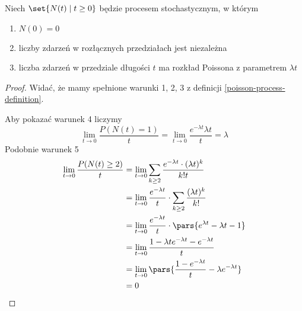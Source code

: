 \begin{theorem}[Twierdzenie 8.8 P\&C]
    Niech \( \set{N(t) \mid t \geq 0} \) będzie procesem stochastycznym, w którym
    \begin{enumerate}
        \item \( N(0) = 0 \)
        \item liczby zdarzeń w rozłącznych przedziałach jest niezależna
        \item liczba zdarzeń w przedziale długości \( t \) ma rozkład Poissona z parametrem \( \lambda t \)
    \end{enumerate}
\end{theorem}
\begin{proof}
    Widać, że mamy spełnione warunki 1, 2, 3 z definicji \ref{poisson-process-definition}.
    
    Aby pokazać warunek 4 liczymy
    \[
        \lim_{t \rightarrow 0} \frac{P(N(t) = 1)}{t} = \lim_{t \rightarrow 0} \frac{e^{-\lambda t}\lambda t}{t} = \lambda
    \]
    Podobnie warunek 5
    \begin{align*}
        \lim_{t \rightarrow 0} \frac{P(N(t) \geq 2)}{t} 
        &= \lim_{t \rightarrow 0} \sum_{k \geq 2} \frac{e^{-\lambda t}\cdot(\lambda t)^k}{k!t} \\
        &= \lim_{t \rightarrow 0} \frac{e^{-\lambda t}}{t} \cdot \sum_{k \geq 2} \frac{(\lambda t)^k}{k!} \\
        &= \lim_{t \rightarrow 0} \frac{e^{-\lambda t}}{t} \cdot \pars{e^{\lambda t} - \lambda t - 1} \\
        &= \lim_{t \rightarrow 0} \frac{1 - \lambda t e^{-\lambda t} - e^{-\lambda t}}{t} \\
        &= \lim_{t \rightarrow 0} \pars{\frac{1 - e^{-\lambda t}}{t} - \lambda e^{-\lambda t}} \\
        &= 0
    \end{align*}
\end{proof}

